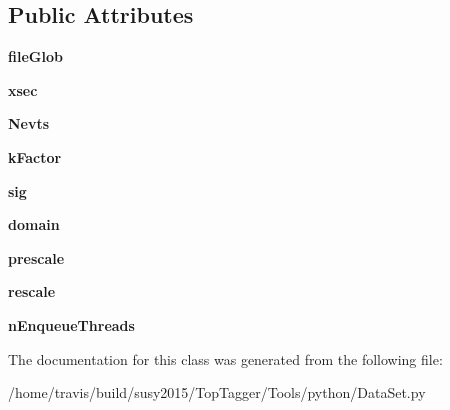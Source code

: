 \subsection*{Public Attributes}
\begin{DoxyCompactItemize}
\item 
\hypertarget{classDataSet_1_1DataSet_a31312e7ebc75a63846784ead3f5cf8d1}{{\bfseries file\-Glob}}\label{classDataSet_1_1DataSet_a31312e7ebc75a63846784ead3f5cf8d1}

\item 
\hypertarget{classDataSet_1_1DataSet_ada08c6b544a58467403e9ab421057b5f}{{\bfseries xsec}}\label{classDataSet_1_1DataSet_ada08c6b544a58467403e9ab421057b5f}

\item 
\hypertarget{classDataSet_1_1DataSet_a69beaca98bb3ebb6061af614c70c5a80}{{\bfseries Nevts}}\label{classDataSet_1_1DataSet_a69beaca98bb3ebb6061af614c70c5a80}

\item 
\hypertarget{classDataSet_1_1DataSet_a6813ebb37a959a59becf21a06fda7e1f}{{\bfseries k\-Factor}}\label{classDataSet_1_1DataSet_a6813ebb37a959a59becf21a06fda7e1f}

\item 
\hypertarget{classDataSet_1_1DataSet_aadcca5cbd9d7962486695097ea39f34b}{{\bfseries sig}}\label{classDataSet_1_1DataSet_aadcca5cbd9d7962486695097ea39f34b}

\item 
\hypertarget{classDataSet_1_1DataSet_a10068706fbc43da752a9a839cdedff1a}{{\bfseries domain}}\label{classDataSet_1_1DataSet_a10068706fbc43da752a9a839cdedff1a}

\item 
\hypertarget{classDataSet_1_1DataSet_a483dac2804e4ea9d834d944ba9d5664e}{{\bfseries prescale}}\label{classDataSet_1_1DataSet_a483dac2804e4ea9d834d944ba9d5664e}

\item 
\hypertarget{classDataSet_1_1DataSet_ac5ea1a521dbffb539f7ccce804b64393}{{\bfseries rescale}}\label{classDataSet_1_1DataSet_ac5ea1a521dbffb539f7ccce804b64393}

\item 
\hypertarget{classDataSet_1_1DataSet_a290520ed790c13b0b0eb84a3530f9167}{{\bfseries n\-Enqueue\-Threads}}\label{classDataSet_1_1DataSet_a290520ed790c13b0b0eb84a3530f9167}

\end{DoxyCompactItemize}


The documentation for this class was generated from the following file\-:\begin{DoxyCompactItemize}
\item 
/home/travis/build/susy2015/\-Top\-Tagger/\-Tools/python/Data\-Set.\-py\end{DoxyCompactItemize}
